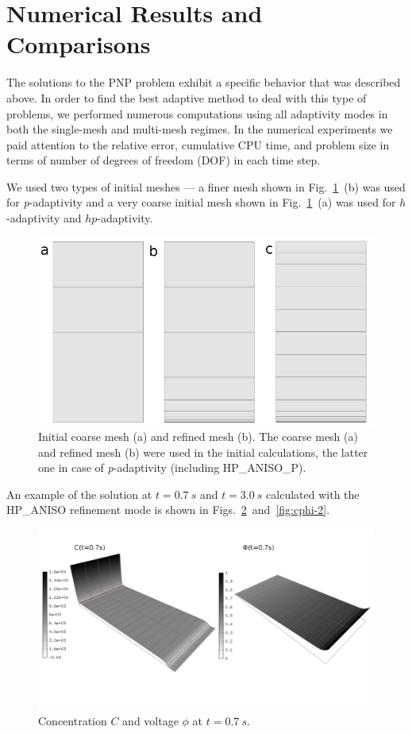 \section{Numerical Results and Comparisons}\label{sec:results}


The solutions to the PNP problem exhibit a specific behavior that was 
described above. In order to find the best adaptive method to deal with 
this type of problems, we performed numerous computations using all 
adaptivity modes in both the single-mesh and multi-mesh regimes.
In the numerical experiments we paid attention to the 
relative error, cumulative CPU time, and problem size 
in terms of number of degrees of freedom (DOF) in each 
time step. 

We used two types of initial meshes --- a finer mesh shown 
in Fig.~\ref{fig:mesh}~(b) was used for \emph{p}-adaptivity
and a very coarse initial mesh shown in  Fig.~\ref{fig:mesh}~(a) was 
used for $h$-adaptivity and $hp$-adaptivity.

\begin{figure}[!ht]
  \begin{centering}
  \includegraphics[width=.6\columnwidth]{mesh}
  \caption{\label{fig:mesh} Initial coarse mesh (a)
  	and refined mesh (b). The coarse mesh (a)
	and refined mesh (b) were used in the initial calculations, the latter one
	in case of \emph{p}-adaptivity (including HP\_ANISO\_P).}
  \end{centering}
\end{figure}

An example of the solution at $t=0.7\ s$ and $t=3.0\ s$ 
calculated with the HP\_ANISO refinement mode is shown
in Figs.~\ref{fig:cphi-1}~and~\ref{fig:cphi-2}. 

\begin{figure}[!ht]
  \begin{centering}
  \includegraphics[width=\columnwidth]{cphi-1}
  \caption{\label{fig:cphi-1} Concentration $C$
  and voltage $\phi$ at $t=0.7\ s$.}
  \end{centering}
\end{figure}

